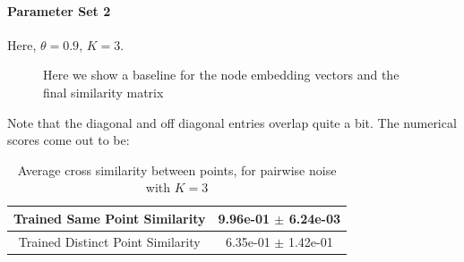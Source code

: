 \documentclass[a4paper]{article}
\begin{document}
\paragraph{Parameter Set 2}
Here, $\theta = 0.9$, $K = 3$.
\begin{figure}[H]
    \centering
    \caption{Here we show a baseline for the node embedding vectors and the final similarity matrix}
    \label{fig:pairwise3_plot}
\end{figure}
Note that the diagonal and off diagonal entries overlap quite a bit.
The numerical scores come out to be:
\begin{table}[H]
    \centering
    \begin{tabular}{|c|c|} \hline
        Trained Same Point Similarity      & 9.96e-01 $\pm$ 6.24e-03  \\ \hline
        Trained Distinct Point Similarity  & 6.35e-01 $\pm$ 1.42e-01  \\ \hline
    \end{tabular}
    \caption{Average cross similarity between points, for pairwise noise with $K=3$}
    \label{tab:pairwise3_table}
\end{table}
\end{document}
